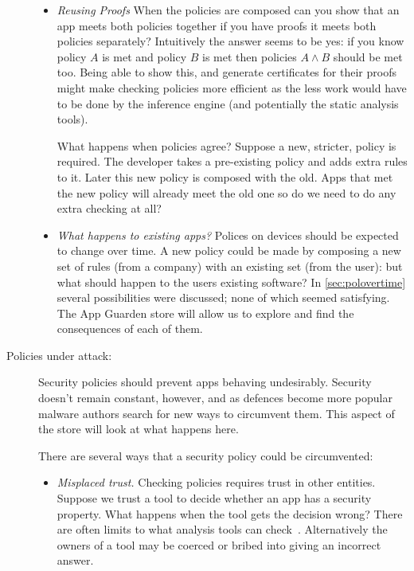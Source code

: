 \documentclass[a4paper,sfsidenotes]{%
  scrartcl%
}
\begin{document}
\begin{description}
\begin{itemize}
      \item \emph{Reusing Proofs}
        When the policies are composed can you show that an app meets both
        policies together if you have proofs it meets both policies separately?
        Intuitively the answer seems to be yes: if you know policy $A$ is met
        and policy $B$ is met then policies $A\wedge B$ should be met too.
        Being able to show this, and generate certificates for their proofs
        might make checking policies more efficient as the less work would have
        to be done by the inference engine (and potentially the static analysis
        tools).

        What happens when policies agree? Suppose a new, stricter,
        policy is required.  The developer takes a pre-existing policy and adds
        extra rules to it.  Later this new policy is composed with the old.
        Apps that met the new policy will already meet the old one so do we need
        to do any extra checking at all?  

      \item \emph{What happens to existing apps?} Polices on devices should be
        expected to change over time.  A new policy could be made by composing a
        new set of rules (from a company) with an existing set (from the user):
        but what should happen to the users existing software?  In
        \autoref{sec:polovertime} several possibilities were discussed; none
        of which seemed satisfying.  The App Guarden store will allow us to
        explore and find the consequences of each of them.
        
    \end{itemize}

  \item[Policies under attack:]  Security policies should prevent apps behaving
    undesirably.  Security doesn't remain constant, however, and as
    defences become more popular malware authors search for new ways to
    circumvent them.  This aspect of the store will look at what happens here.

    There are several ways that a security policy could be circumvented:

    \begin{itemize} 
      
      \item \emph{Misplaced trust.}  Checking policies requires trust in other
        entities.  Suppose we trust a tool to decide whether an app has a
        security property.  What happens when the tool gets the decision wrong?
        There are often limits to what analysis tools can
        check~\cite{Livshits:ww}.  Alternatively the owners of a tool may be
        coerced or bribed into giving an incorrect answer.  
        

\end{itemize}
\end{description}
\end{document}
